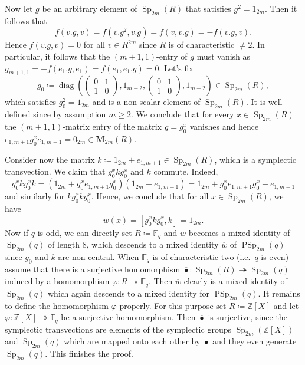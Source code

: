 \documentclass[a4paper,11pt]{amsproc}
\newcommand{\ints}{\mathbb{Z}}%
\newcommand{\finfield}{\mathbb{F}}%
\DeclareMathOperator{\diag}{diag}%
\newcommand{\M}{\mathbf{M}}%
\DeclareMathOperator{\Sp}{Sp}%
\DeclareMathOperator{\PSp}{PSp}%
\theoremstyle{plain}
\theoremstyle{definition}
\begin{document}
	Now let $g$ be an arbitrary element of $\Sp_{2m}(R)$ that satisfies $g^2=1_{2m}$. Then it follows that 
	$$
	f(v.g,v) = f(v.g^2,v.g)=f(v,v.g)=-f(v.g,v).
	$$ 
	Hence $f(v.g,v)=0$ for all $v\in R^{2m}$ since $R$ is of characteristic $\neq 2$. In particular, it follows that the $(m+1,1)$-entry of $g$ must vanish as
	$g_{m+1,1}=-f(e_1.g,e_1)=f(e_1,e_1.g)=0$. Let's fix 
	$$
	g_0\coloneqq\diag\left(\left(\begin{smallmatrix}
		0 & 1 \\ 1 & 0
	\end{smallmatrix} \right),1_{m-2},\left(\begin{smallmatrix}
		0 & 1 \\ 1 & 0
	\end{smallmatrix} \right),1_{m-2}\right)\in\Sp_{2m}(R),
	$$ 
	which satisfies $g_0^2=1_{2m}$ and is a non-scalar element of $\Sp_{2m}(R)$. It is well-defined since by assumption $m\geq 2$. We conclude that for every $x\in\Sp_{2m}(R)$ the $(m+1,1)$-matrix entry of the matrix $g=g_0^x$ vanishes and hence $e_{1,m+1}g_0^x e_{1,m+1}=0_{2m}\in\M_{2m}(R)$. 
	
	Consider now the matrix
	$k\coloneqq 1_{2m}+e_{1,m+1}\in\Sp_{2m}(R)$, which is a symplectic transvection. We claim that 
	$g_0^x k g_0^x$ and $k$ commute. Indeed,
	$$
	g_0^x k g_0^x k = (1_{2m} + g_0^x e_{1,m+1} g_0^x)(1_{2m}+e_{1,m+1})=1_{2m}+g_0^x e_{1,m+1} g_0^x + e_{1,m+1}
	$$
	and similarly for $k g_0^x k g_0^x$. Hence, we conclude that for all $x\in\Sp_{2m}(R)$, we have
	$$
	w(x)= [g_0^x k g_0^x,k]=1_{2m}.
	$$
	Now if $q$ is odd, we can directly set $R\coloneqq\finfield_q$ and $w$ becomes a mixed identity of $\Sp_{2m}(q)$ of length 8, which descends to a mixed identity $\overline{w}$ of $\PSp_{2m}(q)$ since $g_0$ and $k$ are non-central. When $\finfield_q$ is of characteristic two (i.e.\ $q$ is even) assume that there is a surjective homomorphism $\overline{\bullet}\colon\Sp_{2m}(R)\twoheadrightarrow\Sp_{2m}(q)$ induced by a homomorphism $\varphi\colon R\twoheadrightarrow\finfield_q$. Then $\overline{w}$ clearly is a mixed identity of $\Sp_{2m}(q)$ which again descends to a mixed identity for $\PSp_{2m}(q)$. It remains to define the homomorphism $\varphi$ properly. For this purpose set $R\coloneqq\ints[X]$ and let $\varphi\colon\ints[X]\twoheadrightarrow\finfield_q$ be a surjective homomorphism. Then $\overline{\bullet}$ is surjective, since the symplectic transvections are elements of the symplectic groups $\Sp_{2m}(\ints[X])$ and $\Sp_{2m}(q)$ which are mapped onto each other by $\overline{\bullet}$ and they even generate $\Sp_{2m}(q)$.
	This finishes the proof.
	
\end{document}
